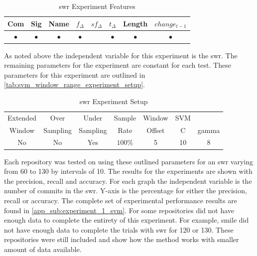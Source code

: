 \begin{table}[h]
\begin{center}

    \begin{tabular}{|c|c|c|c|c|c|c|c|}
        \hline
        Com & Sig & Name & $f_{\Delta}$ & $sf_{\Delta}$ & $t_\Delta$ & Length & $change_{t-1}$ \\
        \hline
        $\bullet$ & $\bullet$ & $\bullet$ & $\bullet$ & & $\bullet$ & $\bullet$ & $\bullet$ \\ \hline
    \end{tabular}
    \caption{\gls{swr} Experiment Features}
    \label{tab:svm_window_range_experiment_features}
\end{center}
\end{table}

As noted above the independent variable for this experiment is the \gls{swr}. The remaining parameters for the experiment are constant for each test. These parameters for this experiment are outlined in \autoref{tab:svm_window_range_experiment_setup}.

\begin{table}[h]
\begin{center}

    \begin{tabular}{|c|c|c|c|c|cc|}
        \hline
        Extended & Over & Under & Sample & Window & SVM & \\
        Window & Sampling & Sampling & Rate & Offset & C & gamma \\ \hline
        No & No & Yes & $100\%$ & 5 & 10 & 8 \\ \hline
    \end{tabular}
    \caption{\gls{swr} Experiment Setup}
    \label{tab:svm_window_range_experiment_setup}
\end{center}

\end{table}

Each repository was tested on using these outlined parameters for an \gls{swr} varying from 60 to 130 by intervals of 10. The results for the experiments are shown with the precision, recall and accuracy. For each graph the independent variable is the number of commits in the \gls{swr}. Y-axis is the percentage for either the precision, recall or accuracy. The complete set of experimental performance results are found in \autoref{app_sub:experiment_1_svm}. For some repositories did not have enough data to complete the entirety of this experiment. For example, smile did not have enough data to complete the trials with \gls{swr} for 120 or 130. These repositories were still included and show how the method works with smaller amount of data available.

